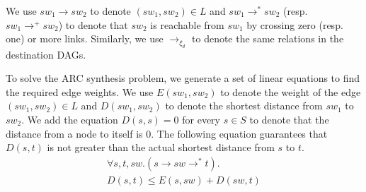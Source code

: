 We use  $sw_1\rightarrow sw_2$ to denote $(sw_1,sw_2)\in L$ and
$sw_1\rightarrow^* sw_2$ (resp. $sw_1\rightarrow^+ sw_2$) to denote that $sw_2$ is reachable from $sw_1$ by crossing zero (resp. one) or more links.
Similarly, we use $\rightarrow_{\xi_d}$ to denote the same relations in the destination DAGs.


To solve the ARC synthesis problem, we generate a set of linear equations
to find the required edge weights. 
We use $E(sw_1, sw_2)$ to denote the weight of the edge $(sw_1,sw_2)\in L$
and 
$D(sw_1, sw_2)$ to denote the shortest distance from $sw_1$ to $sw_2$.
We add the equation $D(s,s) = 0$ for every $s\in S$ to denote that the distance
from a node to itself is $0$.
The
following equation guarantees that $D(s,t)$ is not greater than 
the actual shortest distance from $s$ to $t$.
\begin{multline} \label{eq:dist}
\forall s, t, sw. (s \rightarrow sw \rightarrow^* t).\\
D(s, t) \leq E(s, sw) + D(sw, t)
\end{multline}

